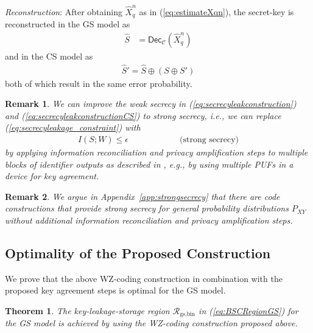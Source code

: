 \documentclass[journal,10pt,twoside]{IEEEtran}
\newcommand{\Dec}{\mathsf{Dec}}
\newcommand*\xor{\mathbin{\oplus}}
\newtheorem{theorem}{Theorem}
\newtheorem{remark}{Remark}
\begin{document}
\emph{Reconstruction}: After obtaining $\widehat{X}_{q}^n$ as in (\ref{eq:estimateXqn}), the secret-key is reconstructed in the GS model as 
\begin{align}
\widehat{S}&= \Dec_{\mathcal{C}}(\widehat{X}_{q}^n)
\end{align}
and in the CS model as 
\begin{align}
\widehat{S}'=\widehat{S}\xor(S\xor S')
\end{align}
both of which result in the same error probability.


\begin{remark}\label{rem:Maurerremark}
	We can improve the weak secrecy in (\ref{eq:secrecyleakconstruction}) and (\ref{eq:secrecyleakconstructionCS}) to strong secrecy, i.e., we can replace (\ref{eq:secrecyleakage_constraint}) with
	\begin{align}
	I(S;W)\leq \epsilon \qquad\qquad\qquad\text{(strong secrecy)}\label{eq:strongsecrecy_constraint}
	\end{align}
	by applying information reconciliation and privacy amplification steps to multiple blocks of identifier outputs as described in \cite{MaurerSecrecyFree}, e.g., by using multiple PUFs in a device for key agreement. 
\end{remark}

\begin{remark}
	We argue in Appendix~\ref{app:strongsecrecy} that there are code constructions that provide strong secrecy for general probability distributions $P_{XY}$ without additional information reconciliation and privacy amplification steps. 
\end{remark}


\subsection{Optimality of the Proposed Construction}
We prove that the above WZ-coding construction in combination with the proposed key agreement steps is optimal for the GS model.
\begin{theorem}\label{theo:GSoptimal}
	The key-leakage-storage region $\mathcal{R}_{\text{gs,bin}}$ in (\ref{eq:BSCRegionGS}) for the GS model is achieved by using the WZ-coding construction proposed above.
\end{theorem}
 
\end{document}
